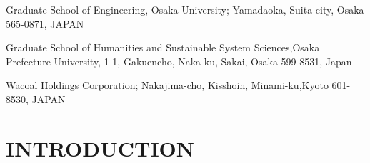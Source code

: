 \documentclass[E]{scitrans}
\begin{document}

\address{**}{Graduate School of Engineering,
	Osaka University;
	Yamadaoka, Suita city, Osaka 565-0871, JAPAN}
\address{***}{Graduate School of Humanities and Sustainable System Sciences,Osaka Prefecture University, 1-1, Gakuencho, Naka-ku, Sakai, Osaka 599-8531, Japan}
\address{****}{Wacoal Holdings Corporation;
	Nakajima-cho, Kisshoin, Minami-ku,Kyoto 601-8530, JAPAN}


%

\section*{INTRODUCTION}
\end{document}

